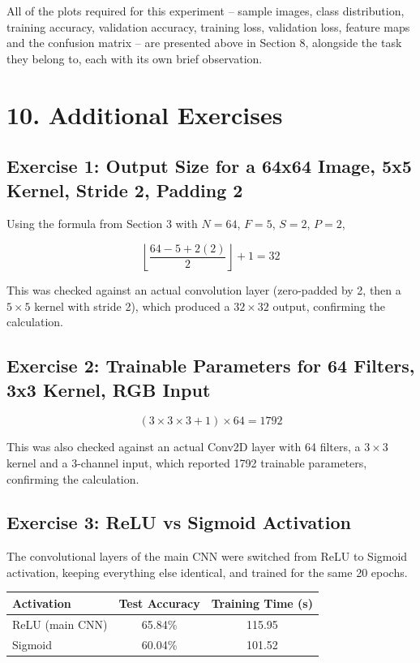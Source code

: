 \documentclass[11pt]{article}
\begin{document}
All of the plots required for this experiment -- sample images, class
distribution, training accuracy, validation accuracy, training loss,
validation loss, feature maps and the confusion matrix -- are presented
above in Section 8, alongside the task they belong to, each with its own
brief observation.


\section*{10. Additional Exercises}

\subsection*{Exercise 1: Output Size for a 64x64 Image, 5x5 Kernel,
Stride 2, Padding 2}

Using the formula from Section 3 with $N=64$, $F=5$, $S=2$, $P=2$,

\[
\left\lfloor\frac{64-5+2(2)}{2}\right\rfloor+1=32
\]

This was checked against an actual convolution layer (zero-padded by 2,
then a $5\times5$ kernel with stride 2), which produced a $32\times32$
output, confirming the calculation.

\subsection*{Exercise 2: Trainable Parameters for 64 Filters, 3x3
Kernel, RGB Input}

\[
(3\times3\times3+1)\times64=1792
\]

This was also checked against an actual Conv2D layer with 64 filters, a
$3\times3$ kernel and a 3-channel input, which reported 1792 trainable
parameters, confirming the calculation.

\subsection*{Exercise 3: ReLU vs Sigmoid Activation}

The convolutional layers of the main CNN were switched from ReLU to
Sigmoid activation, keeping everything else identical, and trained for
the same 20 epochs.

\begin{center}
\begin{tabular}{|l|c|c|}
\hline
Activation & Test Accuracy & Training Time (s)\\
\hline
ReLU (main CNN) & 65.84\% & 115.95\\
Sigmoid & 60.04\% & 101.52\\
\hline
\end{tabular}
\end{center}
\end{document}

